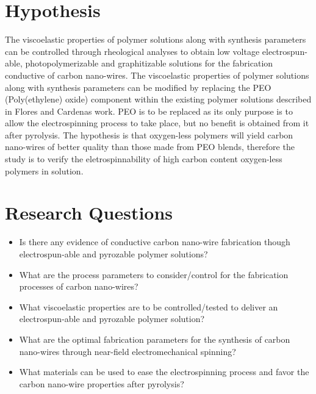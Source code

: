 \section{Hypothesis}

The viscoelastic properties of polymer solutions along with synthesis parameters
can be controlled through rheological analyses to obtain low voltage electrospun-able, photopolymerizable and graphitizable solutions for the fabrication conductive of carbon nano-wires.
The viscoelastic properties of polymer solutions along with synthesis parameters can be modified by replacing the PEO (Poly(ethylene) oxide) component within the existing polymer solutions described in Flores \cite{Flores2017} and Cardenas \cite{Cardenas2017} work. PEO is to be replaced as its only purpose is to allow the electrospinning process to take place, but no benefit is obtained from it after pyrolysis. The hypothesis is that oxygen-less polymers will yield carbon nano-wires of better quality than those made from PEO blends, therefore the study is to verify the eletrospinnability of high carbon content oxygen-less polymers in solution.

\section{Research Questions}

\begin{itemize}
	\item{
	Is there any evidence of conductive carbon nano-wire fabrication though electrospun-able and pyrozable polymer solutions?
	}
	\item{
	What are the process parameters to consider/control for the fabrication processes of carbon nano-wires? 
	}
	\item{
	What viscoelastic properties are to be controlled/tested to deliver an electrospun-able and pyrozable polymer solution?	
	}
	\item{
	What are the optimal fabrication parameters for the synthesis of carbon nano-wires through near-field electromechanical spinning?	
	}
	\item{
	What materials can be used to ease the electrospinning process and favor the carbon nano-wire properties after pyrolysis? 
	}
\end{itemize}

